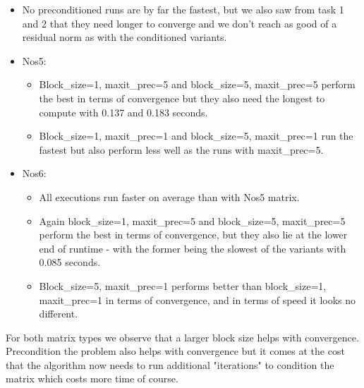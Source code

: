 \documentclass{article}
\begin{document}
 \begin{itemize}
    \item No preconditioned runs are by far the fastest, but we also saw from task 1 and 2 that they need longer to converge and we don't reach as good of a residual norm as with the conditioned variants.
    \item Nos5:
    \begin{itemize}
        \item Block\_size=1, maxit\_prec=5 and block\_size=5, maxit\_prec=5 perform the best in terms of convergence but they also need the longest to compute with 0.137 and 0.183 seconds.
        \item Block\_size=1, maxit\_prec=1 and block\_size=5, maxit\_prec=1 run the fastest but also perform less well as the runs with maxit\_prec=5.
    \end{itemize}
    \item Nos6:
    \begin{itemize}
        \item All executions run faster on average than with Nos5 matrix.
        \item Again block\_size=1, maxit\_prec=5 and block\_size=5, maxit\_prec=5 perform the best in terms of convergence, but they also lie at the lower end of runtime - with the former being the slowest of the variants with 0.085 seconds.
        \item Block\_size=5, maxit\_prec=1 performs better than block\_size=1, maxit\_prec=1 in terms of convergence, and in terms of speed it looks no different.
    \end{itemize}
\end{itemize}

For both matrix types we observe that a larger block size helps with convergence. Precondition the problem also helps with convergence but it comes at the cost that the algorithm now needs to run additional "iterations" to condition the matrix which costs more time of course.
\end{document}
